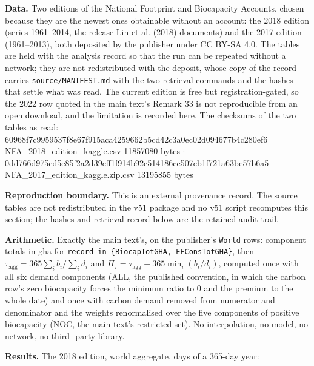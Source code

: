 \documentclass[11pt]{article}
\begin{document}
\textbf{Data.} Two editions of the National Footprint and Biocapacity Accounts, chosen because they are the newest ones obtainable without an account: the 2018 edition (series 1961--2014, the release Lin et al. (2018) documents) and the 2017 edition (1961--2013), both deposited by the publisher under CC BY-SA 4.0. The tables are held with the analysis record so that the run can be repeated without a network; they are not redistributed with the deposit, whose copy of the record carries \texttt{source/\allowbreak{}MANIFEST.\allowbreak{}md} with the two retrieval commands and the hashes that settle what was read. The current edition is free but registration-gated, so the 2022 row quoted in the main text's Remark 33 is not reproducible from an open download, and the limitation is recorded here. The checksums of the two tables as read: 60968f7c9959537f\allowbreak{}8e67f915aca42596\allowbreak{}62b5cd42c3a0ec02\allowbreak{}d094677b4c280ef6 NFA\_2018\_edition\_kaggle.csv 11857080 bytes \(\cdot\) 0dd766d975cd5e85\allowbreak{}f2a2d39cff1f914b\allowbreak{}92c514186ce507cb\allowbreak{}1f721a63be57b6a5 NFA\_2017\_edition\_kaggle.zip.csv 13195855 bytes

\textbf{Reproduction boundary.} This is an external provenance record. The source tables are not redistributed in the v51 package and no v51 script recomputes this section; the hashes and retrieval record below are the retained audit trail.

\textbf{Arithmetic.} Exactly the main text's, on the publisher's \texttt{World} rows: component totals in gha for \texttt{record in \{B\allowbreak{}iocapTotGHA,\allowbreak{} EFConsTotGH\allowbreak{}A\}}, then \(\tau_{\mathrm{agg}} = 365\sum_i b_i/\sum_i d_i\) and \(\Pi_\tau = \tau_{\mathrm{agg}} - 365\min_i(b_i/\allowbreak{}d_i)\), computed once with all six demand components (ALL, the published convention, in which the carbon row's zero biocapacity forces the minimum ratio to 0 and the premium to the whole date) and once with carbon demand removed from numerator and denominator and the weights renormalised over the five components of positive biocapacity (NOC, the main text's restricted set). No interpolation, no model, no network, no third- party library.

\textbf{Results.} The 2018 edition, world aggregate, days of a 365-day year:
\end{document}

